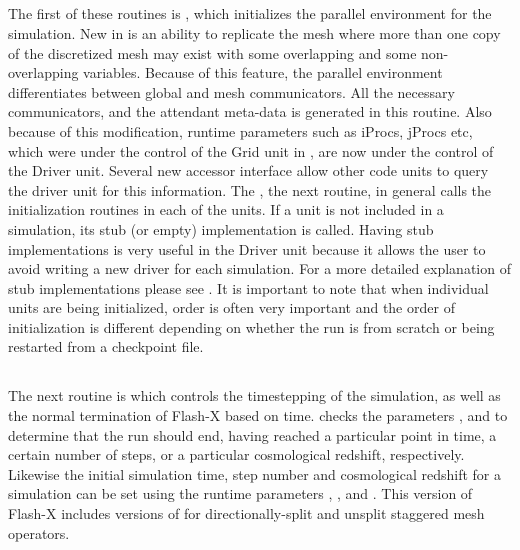 \subsection{}
The first of these routines is , which
  initializes the parallel environment for the simulation. New in
  \flashx is an ability to replicate the mesh where more than one 
copy of the discretized mesh may exist with some overlapping and some 
non-overlapping variables. Because of this feature, the 
parallel environment differentiates between global and mesh
communicators. All the necessary communicators, and the attendant
meta-data is generated in this routine. Also because of this
modification, runtime parameters such as iProcs, jProcs etc, which
were under the control of the Grid unit in \flashx, are now under
the control of the Driver unit. Several new accessor interface
allow other code units to query the driver unit for this information.
The , the next routine, in general calls the
initialization routines in each of the units.  If a unit is not
included in a simulation, its stub (or empty) implementation is
called.  Having stub implementations is very useful in 
the \unit{Driver} unit because it allows the user to avoid writing a new driver
for each simulation.  For a more detailed explanation of stub implementations please see .
It is important to note that when individual units are being
initialized, order is often very important and the order of initialization is different depending
on whether the run is from scratch or being restarted from a checkpoint file.

\subsection{}
The next routine is  which controls
the timestepping of the simulation, as well as the normal termination of Flash-X
based on time.   checks the parameters ,
 and  to determine that the run should end, having 
reached a particular point in time, a certain number of steps, or a particular
cosmological redshift, respectively.  Likewise the initial simulation time, 
step number and cosmological redshift for a simulation can be set using
the runtime parameters , , and . 
This version of Flash-X includes versions of  for 
directionally-split and unsplit staggered mesh operators.

